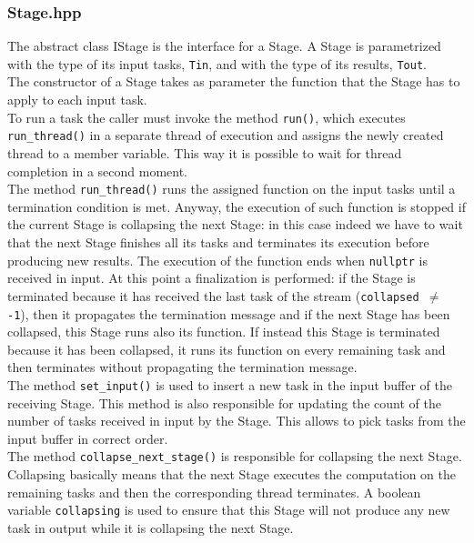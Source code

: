 \documentclass[12pt]{article}
\begin{document}
\subsubsection{Stage.hpp}
The abstract class IStage is the interface for a Stage.
A Stage is parametrized with the type of its input tasks, \texttt{Tin}, and with the type of its results, \texttt{Tout}. \\
The constructor of a Stage takes as parameter the function that the Stage has to apply to each input task. \\
To run a task the caller must invoke the method \texttt{run()}, which executes \texttt{run\_thread()} in a separate thread of execution and assigns the newly created thread to a member variable. This way it is possible to wait for thread completion in a second moment. \\
The method \texttt{run\_thread()} runs the assigned function on the input tasks until a termination condition is met. Anyway, the execution of such function is stopped if the current Stage is collapsing the next Stage: in this case indeed we have to wait that the next Stage finishes all its tasks and terminates its execution before producing new results. The execution of the function ends when \texttt{nullptr} is received in input. At this point a finalization is performed: if the Stage is terminated because it has received the last task of the stream (\texttt{collapsed $\neq$ -1}), then it propagates the termination message and if the next Stage has been collapsed, this Stage runs also its function. If instead this Stage is terminated because it has been collapsed, it runs its function on every remaining task and then terminates without propagating the termination message. \\
The method \texttt{set\_input()} is used to insert a new task in the input buffer of the receiving Stage. This method is also responsible for updating the count of the number of tasks received in input by the Stage. This allows to pick tasks from the input buffer in correct order. \\
The method \texttt{collapse\_next\_stage()} is responsible for collapsing the next Stage. Collapsing basically means that the next Stage executes the computation on the remaining tasks and then the corresponding thread terminates. A boolean variable \texttt{collapsing} is used to ensure that this Stage will not produce any new task in output while it is collapsing the next Stage.
\end{document}
